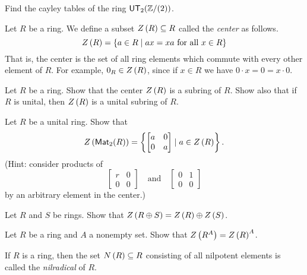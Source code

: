 \begin{exercise}
Find the cayley tables of the ring \(\mathsf{UT}_{2}(\mathbb{Z}/(2))\).
\end{exercise}

\begin{dfn}[Center] \label{dfn:center}
Let \(R\) be a ring.
We define a subset \( Z\left(R\right)  \subseteq R\) called the \emph{center} as follows.
\[ \CENTER{R} = \{ a \in R \mid ax = xa\ \mathrm{for\ all}\ x \in R \} \] That is, the center is the set of all ring elements which commute with every other element of \(R\).
For example, \(0_R \in  Z\left(R\right) \), since if \(x \in R\) we have \(0 \cdot x = 0 = x \cdot 0\).
\end{dfn}

\begin{exercise}
Let \(R\) be a ring.
Show that the center \( Z\left(R\right) \) is a subring of \(R\).
Show also that if \(R\) is unital, then \( Z\left(R\right) \) is a unital subring of \(R\).
\end{exercise}

\begin{exercise}
Let \(R\) be a unital ring.
Show that \[  Z\left(\mathsf{Mat}_{2}(R)\right)  = \left\{ \begin{bmatrix} a & 0 \\ 0 & a \end{bmatrix} \mid a \in  Z\left(R\right)  \right\}. \] (Hint: consider products of \[ \begin{bmatrix} r & 0 \\ 0 & 0 \end{bmatrix} \quad \mathrm{and} \quad \begin{bmatrix} 0 & 1 \\ 0 & 0 \end{bmatrix} \] by an arbitrary element in the center.)
\end{exercise}

\begin{exercise}
Let \(R\) and \(S\) be rings.
Show that \( Z\left(R \oplus S\right)  =  Z\left(R\right)  \oplus  Z\left(S\right) \).
\end{exercise}

\begin{exercise}
Let \(R\) be a ring and \(A\) a nonempty set.
Show that \( Z\left(R^A\right)  =  Z\left(R\right) ^A\).
\end{exercise}

\begin{dfn}[Nilradical] \label{dfn:nilradical}
If \(R\) is a ring, then the set \( N\left(R\right)  \subseteq R\) consisting of all nilpotent elements is called the \emph{nilradical} of \(R\).
\end{dfn}

